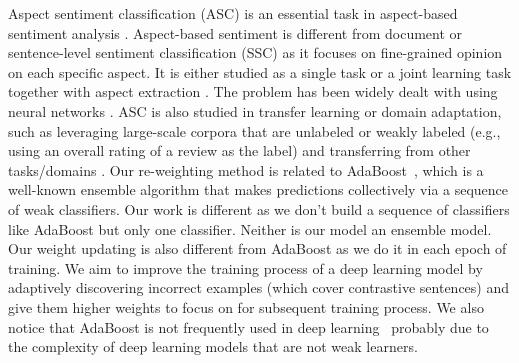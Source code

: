 Aspect sentiment classification (ASC) \cite{hu2004mining} is an essential task in aspect-based sentiment analysis \cite{pang2002thumbs,liu2015sentiment}. Aspect-based sentiment is different from document or sentence-level sentiment classification (SSC) \cite{pang2002thumbs,kim2014convolutional,he2011self,he2011automatically} as it focuses on fine-grained opinion on each specific aspect. It is either studied as a single task or a joint learning task together with aspect extraction \cite{wang2017coupled,li2017deep,li2018unified}. The problem has been widely dealt with using neural networks \cite{dong2014adaptive,nguyen-shirai-2015-phrasernn,li2018transformation}.
ASC is also studied in transfer learning or domain adaptation, such as leveraging large-scale corpora that are unlabeled or weakly labeled (e.g., using an overall rating of a review as the label) \cite{xu2019bert,he-EtAl:2018} and transferring from other tasks/domains \cite{li2018exploiting,wang2018lifelong,wang2018target}. 
Our re-weighting method is related to AdaBoost~\cite{freund1997decision}, which is a well-known ensemble algorithm that makes predictions collectively via a sequence of weak classifiers. 
Our work is different as we don’t build a sequence of classifiers like AdaBoost but only one classifier. Neither is our model an ensemble model. Our weight updating is also different from AdaBoost as we do it in each epoch of training.
We aim to improve the training process of a deep learning model by adaptively discovering incorrect examples (which cover contrastive sentences) and give them higher weights to focus on for subsequent training process. 
We also notice that AdaBoost is not frequently used in deep learning~\cite{schwenk2000boosting,mosca2017deep} probably due to the complexity of deep learning models that are not weak learners.

